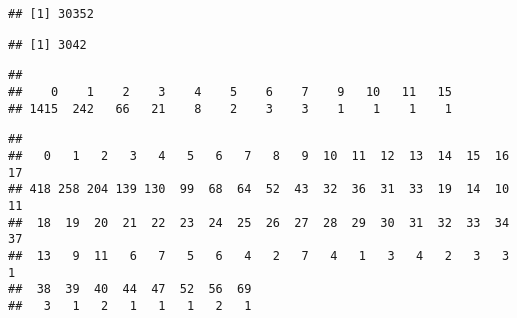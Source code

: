 \documentclass[]{article}
\newenvironment{Shaded}{\begin{snugshade}}{\end{snugshade}}
\newcommand{\KeywordTok}[1]{\textcolor[rgb]{0.13,0.29,0.53}{\textbf{#1}}}
\newcommand{\CommentTok}[1]{\textcolor[rgb]{0.56,0.35,0.01}{\textit{#1}}}
\newcommand{\ControlFlowTok}[1]{\textcolor[rgb]{0.13,0.29,0.53}{\textbf{#1}}}
\newcommand{\OperatorTok}[1]{\textcolor[rgb]{0.81,0.36,0.00}{\textbf{#1}}}
\newcommand{\NormalTok}[1]{#1}
\begin{document}
\begin{verbatim}
## [1] 30352
\end{verbatim}

\begin{Shaded}
\end{Shaded}

\begin{verbatim}
## [1] 3042
\end{verbatim}

\begin{Shaded}
\end{Shaded}

\begin{verbatim}
## 
##    0    1    2    3    4    5    6    7    9   10   11   15 
## 1415  242   66   21    8    2    3    3    1    1    1    1
\end{verbatim}

\begin{Shaded}
\end{Shaded}

\begin{verbatim}
## 
##   0   1   2   3   4   5   6   7   8   9  10  11  12  13  14  15  16  17 
## 418 258 204 139 130  99  68  64  52  43  32  36  31  33  19  14  10  11 
##  18  19  20  21  22  23  24  25  26  27  28  29  30  31  32  33  34  37 
##  13   9  11   6   7   5   6   4   2   7   4   1   3   4   2   3   3   1 
##  38  39  40  44  47  52  56  69 
##   3   1   2   1   1   1   2   1
\end{verbatim}
\end{document}
